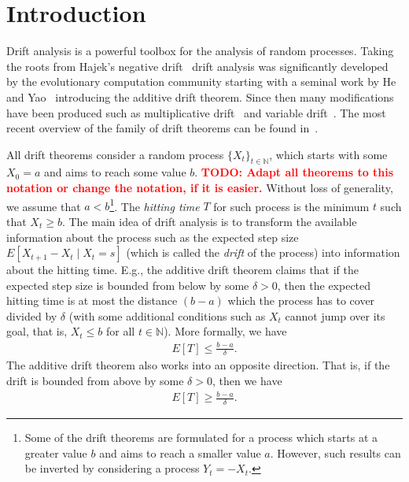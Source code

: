 \documentclass[12pt, a4paper]{article}
\title{\text{Additive drift with tail bounds}}
\author{Vihnin F.
    \and Antipov D.
    \and Sinyachenko N.}
\theoremstyle{remark}
\theoremstyle{definition}
\newcommand{\N}{{\mathbb N}}
\newcommand{\todo}[1]{\textbf{\textcolor{red}{TODO: #1}}}
\begin{document}
\maketitle

\section{Introduction}

Drift analysis is a powerful toolbox for the analysis of random processes. Taking the roots from Hajek's negative drift~\cite{Hajek82} drift analysis was significantly developed by the evolutionary computation community starting with a seminal work by He and Yao~\cite{HeY04} introducing the additive drift theorem. Since then many modifications have been produced such as multiplicative drift~\cite{DoerrJW12} and variable drift~\cite{Johannsen10,RoweS12}. The most recent overview of the family of drift theorems can be found in~\cite{Lengler17}.

All drift theorems consider a random process $\{X_t\}_{t \in \N}$, which starts with some $X_0 = a$ and aims to reach some value $b$. \todo{Adapt all theorems to this notation or change the notation, if it is easier.} Without loss of generality, we assume that $a < b$\footnote{Some of the drift theorems are formulated for a process which starts at a greater value $b$ and aims to reach a smaller value $a$. However, such results can be inverted by considering a process $Y_t = -X_t$.}. The \emph{hitting time} $T$ for such process is the minimum $t$ such that $X_t \ge b$. The main idea of drift analysis is to transform the available information about the process such as the expected step size $E[X_{t + 1} - X_t \mid X_t = s]$ (which is called the \emph{drift} of the process) into information about the hitting time. E.g., the additive drift theorem claims that if the expected step size is bounded from below by some $\delta > 0$, then the expected hitting time is at most the distance $(b - a)$ which the process has to cover divided by $\delta$ (with some additional conditions such as $X_t$ cannot jump over its goal, that is, $X_t \le b$ for all $t \in \N$). More formally, we have
\begin{align*}
    E[T] \le \frac{b - a}{\delta}.
\end{align*}
The additive drift theorem also works into an opposite direction. That is, if the drift is bounded from above by some $\delta > 0$, then we have
\begin{align*}
    E[T] \ge \frac{b - a}{\delta}.
\end{align*}
\end{document}

